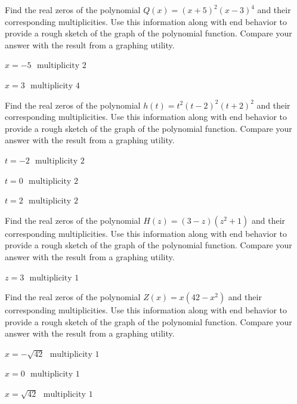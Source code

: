\documentclass{ximera}
\begin{document}
\begin{problem}
Find the real zeros of the polynomial $Q(x) = (x + 5)^{2}(x - 3)^{4}$ and their corresponding multiplicities.  Use this information along with end behavior to provide a rough sketch of the graph of the polynomial function.  Compare your answer with the result from a graphing utility.

\begin{solution}
$x = -5$
$\text{ multiplicity }  {2}$

$x = 3$
$\text{ multiplicity } {4}$

\end{solution}

\end{problem}

\begin{problem}
Find the real zeros of the polynomial $h(t) = t^2(t-2)^2(t+2)^2$ and their corresponding multiplicities.  Use this information along with end behavior to provide a rough sketch of the graph of the polynomial function.  Compare your answer with the result from a graphing utility.

\begin{solution}
$t = -2$
$\text{ multiplicity }  {2}$

$t = 0$
$\text{ multiplicity } {2}$

$t = 2$
$\text{ multiplicity } {2}$

\end{solution}

\end{problem}

\begin{problem}
Find the real zeros of the polynomial $H(z) = (3-z)(z^2+1)$ and their corresponding multiplicities.  Use this information along with end behavior to provide a rough sketch of the graph of the polynomial function.  Compare your answer with the result from a graphing utility.

\begin{solution}
$z = 3$
$\text{ multiplicity }  {1}$

\end{solution}

\end{problem}

\begin{problem}\label{zeromultgraphlast}
Find the real zeros of the polynomial $Z(x) = x(42 - x^{2})$ and their corresponding multiplicities.  Use this information along with end behavior to provide a rough sketch of the graph of the polynomial function.  Compare your answer with the result from a graphing utility.

\begin{solution}
$x = -\sqrt{42}$
$\text{ multiplicity }  {1}$

$x = 0$
$\text{ multiplicity }  {1}$

$x = \sqrt{42}$
$\text{ multiplicity }  {1}$

\end{solution}

\end{problem}
\end{document}
